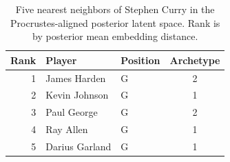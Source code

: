\begin{table}[htbp]
  \centering\small
  \begin{tabular}{rllc}
    \toprule
    Rank & Player & Position & Archetype \\
    \midrule
    1 & James Harden & G & 2 \\
    2 & Kevin Johnson & G & 1 \\
    3 & Paul George & G & 2 \\
    4 & Ray Allen & G & 1 \\
    5 & Darius Garland & G & 1 \\
    \bottomrule
  \end{tabular}
  \caption{Five nearest neighbors of Stephen Curry in the Procrustes-aligned posterior latent space. Rank is by posterior mean embedding distance.}
  \label{tab:Stephen_Curry_neighbors}
\end{table}

